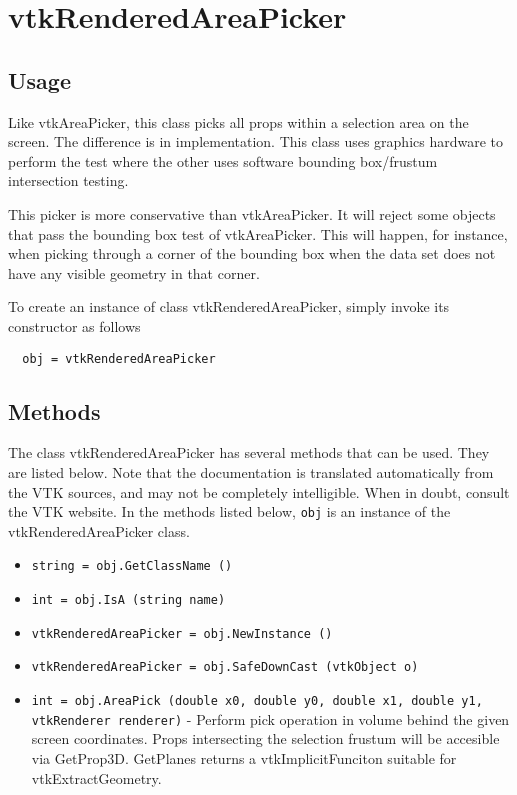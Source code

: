 \section{vtkRenderedAreaPicker}

\subsection{Usage}

 Like vtkAreaPicker, this class picks all props within a selection area 
 on the screen. The difference is in implementation. This class uses
 graphics hardware to perform the test where the other uses software 
 bounding box/frustum intersection testing. 

 This picker is more conservative than vtkAreaPicker. It will reject 
 some objects that pass the bounding box test of vtkAreaPicker. This 
 will happen, for instance, when picking through a corner of the bounding
 box when the data set does not have any visible geometry in that corner.

To create an instance of class vtkRenderedAreaPicker, simply
invoke its constructor as follows
\begin{verbatim}
  obj = vtkRenderedAreaPicker
\end{verbatim}
\subsection{Methods}

The class vtkRenderedAreaPicker has several methods that can be used.
  They are listed below.
Note that the documentation is translated automatically from the VTK sources,
and may not be completely intelligible.  When in doubt, consult the VTK website.
In the methods listed below, \verb|obj| is an instance of the vtkRenderedAreaPicker class.
\begin{itemize}
\item  \verb|string = obj.GetClassName ()|

\item  \verb|int = obj.IsA (string name)|

\item  \verb|vtkRenderedAreaPicker = obj.NewInstance ()|

\item  \verb|vtkRenderedAreaPicker = obj.SafeDownCast (vtkObject o)|

\item  \verb|int = obj.AreaPick (double x0, double y0, double x1, double y1, vtkRenderer renderer)| -  Perform pick operation in volume behind the given screen coordinates.
 Props intersecting the selection frustum will be accesible via GetProp3D.
 GetPlanes returns a vtkImplicitFunciton suitable for vtkExtractGeometry.

\end{itemize}
